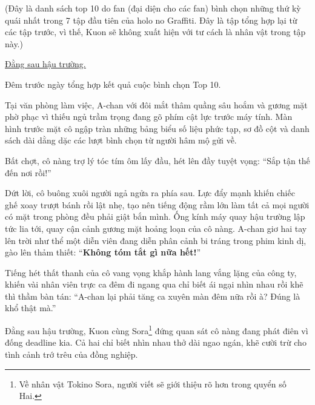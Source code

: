 \documentclass[../main.tex]{subfiles}
\begin{document}

\begin{center}
  (Đây là danh sách top 10 do fan (đại diện cho các fan) bình chọn những thứ kỳ quái nhất trong 7 tập đầu tiên của holo no Graffiti. Đây là tập tổng hợp lại từ các tập trước, vì thế, Kuon sẽ không xuất hiện với tư cách là nhân vật trong tập này.)

  \uline{Đằng sau hậu trường.}
\end{center}

Đêm trước ngày tổng hợp kết quả cuộc bình chọn Top 10.

Tại văn phòng làm việc, A-chan với đôi mắt thâm quầng sâu hoắm và gương mặt phờ phạc vì thiếu ngủ trầm trọng đang gõ phím cật lực trước máy tính. Màn hình trước mặt cô ngập tràn những bảng biểu số liệu phức tạp, sơ đồ cột và danh sách dài dằng dặc các lượt bình chọn từ người hâm mộ gửi về.


Bất chợt, cô nàng trợ lý tóc tím ôm lấy đầu, hét lên đầy tuyệt vọng: ``Sắp tận thế đến nơi rồi!''

Dứt lời, cô buông xuôi người ngả ngửa ra phía sau. Lực đẩy mạnh khiến chiếc ghế xoay trượt bánh rồi lật nhẹ, tạo nên tiếng động rầm lớn làm tất cả mọi người có mặt trong phòng đều phải giật bắn mình. Ống kính máy quay hậu trường lập tức lia tới, quay cận cảnh gương mặt hoảng loạn của cô nàng. A-chan giơ hai tay lên trời như thể một diễn viên đang diễn phân cảnh bi tráng trong phim kinh dị, gào lên thảm thiết: ``\textbf{Không tóm tắt gì nữa hết!}''

Tiếng hét thất thanh của cô vang vọng khắp hành lang vắng lặng của công ty, khiến vài nhân viên trực ca đêm đi ngang qua chỉ biết ái ngại nhìn nhau rồi khẽ thì thầm bàn tán: ``A-chan lại phải tăng ca xuyên màn đêm nữa rồi à? Đúng là khổ thật mà.''

Đằng sau hậu trường, Kuon cùng Sora\footnote{Về nhân vật Tokino Sora, người viết sẽ giới thiệu rõ hơn trong quyển số Hai.} đứng quan sát cô nàng đang phát điên vì đống deadline kia. Cả hai chỉ biết nhìn nhau thở dài ngao ngán, khẽ cười trừ cho tình cảnh trớ trêu của đồng nghiệp.
\end{document}
